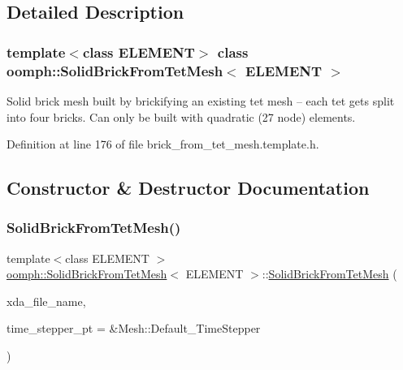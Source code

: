 \subsection{Detailed Description}
\subsubsection*{template$<$class E\+L\+E\+M\+E\+NT$>$\newline
class oomph\+::\+Solid\+Brick\+From\+Tet\+Mesh$<$ E\+L\+E\+M\+E\+N\+T $>$}

Solid brick mesh built by brickifying an existing tet mesh -- each tet gets split into four bricks. Can only be built with quadratic (27 node) elements. 

Definition at line 176 of file brick\+\_\+from\+\_\+tet\+\_\+mesh.\+template.\+h.



\subsection{Constructor \& Destructor Documentation}
\mbox{\label{classoomph_1_1SolidBrickFromTetMesh_afffe8e29788d8f748fcc6aa9d818420d}} 
\subsubsection{\texorpdfstring{Solid\+Brick\+From\+Tet\+Mesh()}{SolidBrickFromTetMesh()}\hspace{0.1cm}{\footnotesize\ttfamily [1/2]}}
{\footnotesize\ttfamily template$<$class E\+L\+E\+M\+E\+NT $>$ \\
\hyperlink{classoomph_1_1SolidBrickFromTetMesh}{oomph\+::\+Solid\+Brick\+From\+Tet\+Mesh}$<$ E\+L\+E\+M\+E\+NT $>$\+::\hyperlink{classoomph_1_1SolidBrickFromTetMesh}{Solid\+Brick\+From\+Tet\+Mesh} (\begin{DoxyParamCaption}\item[{const std\+::string}]{xda\+\_\+file\+\_\+name,  }\item[{Time\+Stepper $\ast$}]{time\+\_\+stepper\+\_\+pt = {\ttfamily \&Mesh\+:\+:Default\+\_\+TimeStepper} }\end{DoxyParamCaption})\hspace{0.3cm}{\ttfamily [inline]}}



